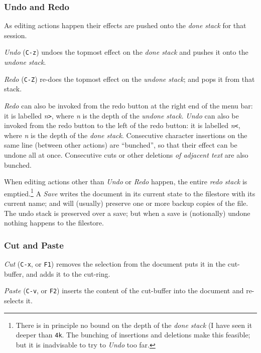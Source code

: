 \documentclass[11pt,a4paper]{article}
\begin{document}
\hypertarget{undo-and-redo}{%
\subsubsection{Undo and Redo}\label{undo-and-redo}}

As editing actions happen their effects are pushed onto the \emph{done
stack} for that session.

\emph{Undo} (\texttt{C-z}) undoes the topmost effect on the \emph{done
stack} and pushes it onto the \emph{undone stack}.

\emph{Redo} (\texttt{C-Z}) re-does the topmost effect on the
\emph{undone stack}; and pops it from that stack.

\emph{Redo} can also be invoked from the redo button at the right
end of the menu bar: it is labelled \emph{n}\texttt{\textgreater{}},
where \emph{n} is the depth of the \emph{undone stack}. \emph{Undo}
can also be invoked from the redo button to the left of the redo
button: it is labelled \emph{n}\texttt{\textless{}}, where \emph{n}
is the depth of the \emph{done stack}. Consecutive character
insertions on the same line (between other actions) are ``bunched'',
so that their effect can be undone all at once. Consecutive cuts
or other deletions \textit{of adjacent text} are also bunched.

When editing actions other than \emph{Undo} or \emph{Redo} happen,
the entire \emph{redo stack} is emptied.\footnote{There is in
principle no bound on the depth of the \emph{done stack} (I have
seen it deeper than \texttt{4k}. The bunching of insertions and
deletions make this feasible; but it is inadvisable to try to
\emph{Undo} too far.}  A \textit{Save} writes the document in its
current state to the filestore with its current name; and will
(usually) preserve one or more backup copies of the file. The undo
stack is preserved over a save; but when a save is (notionally)
undone nothing happens to the filestore.



\hypertarget{cut-and-paste}{%
\subsubsection{Cut and Paste}\label{cut-and-paste}}

\emph{Cut} (\texttt{C-x}, or \texttt{F1}) removes the selection from the
document puts it in the cut-buffer, and adds it to the cut-ring.

\emph{Paste} (\texttt{C-v}, or \texttt{F2}) inserts the content of the
cut-buffer into the document and re-selects it.
\end{document}
